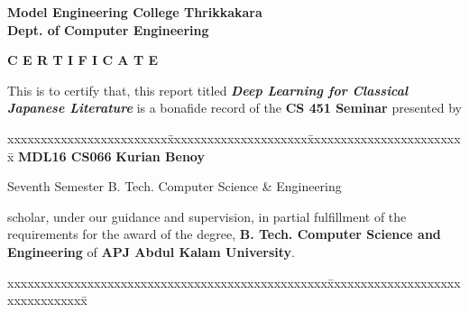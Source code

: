 \documentclass[12pt]{report}
\begin{document}
\begin{titlepage}
\begin{center}
\Large{\textbf{Model Engineering College Thrikkakara}}\\
\Large{\textbf{Dept. of Computer Engineering}}\\
\end{center}
\begin{figure}[h]
\begin{center}
\end{center}
\end{figure}
\begin{center}
\Large{\textbf{C E R T I F I C A T E}}\\
\vspace{.1in}
\end{center}
This is to certify that, this report titled \textbf{\textit{ Deep
Learning for Classical Japanese Literature}} is a bonafide record of
the \textbf{CS 451 Seminar} presented by
\begin{center}
 \begin{tabbing}
   xxxxxxxxxxxxxxxxxxxxxxxx\=xxxxxxxxxxxxxxxxxxxxx\=
xxxxxxxxxxxxxxxxxxxxxxxx\=\kill
\Large{\textbf{MDL16 CS066 }}     \>\Large{\textbf{Kurian Benoy}}\\
\end{tabbing}
\end{center}
\begin{center}

Seventh Semester B. Tech.
Computer Science \& Engineering  \end{center} scholar, under our
guidance and supervision, in partial
 fulfillment of the requirements for the award of the degree,\textbf{
B. Tech. Computer
Science  and Engineering} of \textbf{APJ Abdul Kalam University}.
\vspace{.2in}
\begin{tabbing}
xxxxxxxxxxxxxxxxxxxxxxxxxxxxxxxxxxxxxxxxxxxxxxxx\=
xxxxxxxxxxxxxxxxxxxxxxxxxxxxxxxx\= \kill


\end{tabbing}
\end{titlepage}
\end{document}
